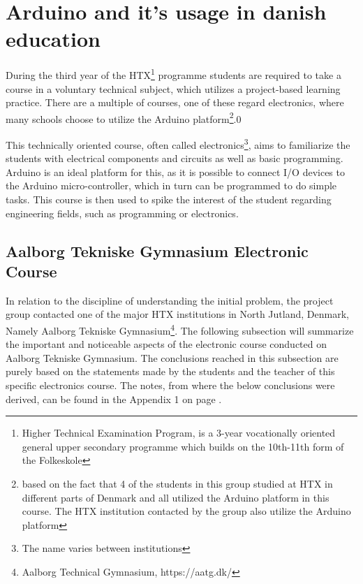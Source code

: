 
\section{Arduino and it's usage in danish education}
During the third year of the HTX\footnote{Higher Technical Examination Program, is a 3-year vocationally oriented general upper secondary programme which builds on the 10th-11th form of the Folkeskole\cite{htx_wiki}} programme students are required to take a course in a voluntary technical subject, which utilizes a project-based learning practice. 
There are a multiple of courses, one of these regard electronics, where many schools choose to utilize the Arduino platform\footnote{based on the fact that 4 of the students in this group studied at HTX in different parts of Denmark and all utilized the Arduino platform in this course. 
The HTX institution contacted by the group also utilize the Arduino platform}\cite{holstebro_education}.0

This technically oriented course, often called electronics\footnote{The name varies between institutions}, aims to familiarize the students with electrical components and circuits as well as basic programming.\cite{holstebro_electronic}
Arduino is an ideal platform for this, as it is possible to connect I/O devices to the Arduino micro-controller, which in turn can be programmed to do simple tasks. 
This course is then used to spike the interest of the student regarding engineering fields, such as programming or electronics.


\subsection{Aalborg Tekniske Gymnasium Electronic Course}
In relation to the discipline of understanding the initial problem, the project group contacted one of the major HTX institutions in North Jutland, Denmark, Namely Aalborg Tekniske Gymnasium\footnote{Aalborg Technical Gymnasium, https://aatg.dk/}. 
The following subsection will summarize the important and noticeable aspects of the electronic course conducted on Aalborg Tekniske Gymnasium. 
The conclusions reached in this subsection are purely based on the statements made by the students and the teacher of this specific electronics course.
The notes, from where the below conclusions were derived, can be found in the Appendix 1 on page \pageref{Interviews}.

